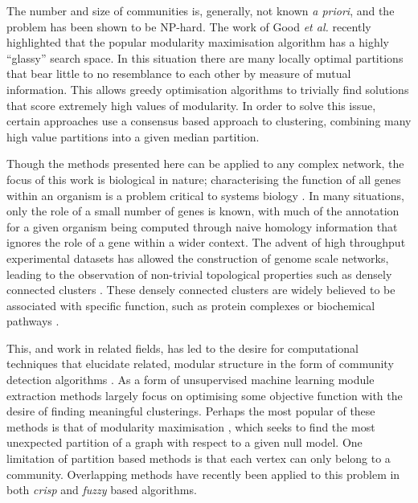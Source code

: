 \documentclass[a4paper,10pt]{article}
\begin{document}
The number and size of communities is, generally, not known \textit{a priori}, and the problem has been shown to be NP-hard.
The work of Good \textit{et al.} \cite{good2010performance} recently highlighted that the popular modularity maximisation algorithm has a highly ``glassy'' search space.
In this situation there are many locally optimal partitions that bear little to no resemblance to each other by measure of mutual information.
This allows greedy optimisation algorithms \cite{blondel2008fast} to trivially find solutions that score extremely high values of modularity.
In order to solve this issue, certain approaches use a consensus based approach to clustering, combining many high value partitions into a given median partition.

Though the methods presented here can be applied to any complex network, the focus of this work is biological in nature; characterising the function of all genes within an organism is a problem critical to systems biology \cite{}.
In many situations, only the role of a small number of genes is known, with much of the annotation for a given organism being computed through naive homology information that ignores the role of a gene within a wider context.
The advent of high throughput experimental datasets has allowed the construction of genome scale networks, leading to the observation of non-trivial topological properties such as densely connected clusters \cite{ArabidopsisConsortium2011}.
These densely connected clusters are widely believed to be associated with specific function, such as protein complexes or biochemical pathways \cite{}.

This, and work in related fields, has led to the desire for computational techniques that elucidate related, modular structure in the form of community detection algorithms \cite{fortunato2010community}.
As a form of unsupervised machine learning module extraction methods largely focus on optimising some objective function with the desire of finding meaningful clusterings.
Perhaps the most popular of these methods is that of modularity maximisation \cite{newman2004}, which seeks to find the most unexpected partition of a graph with respect to a given null model.
One limitation of partition based methods is that each vertex can only belong to a community.
Overlapping methods have recently been applied to this problem in both \textit{crisp} \cite{ahn2010link, lancichinetti2011finding} and \textit{fuzzy} \cite{gregory2011fuzzy} based algorithms.
\end{document}
